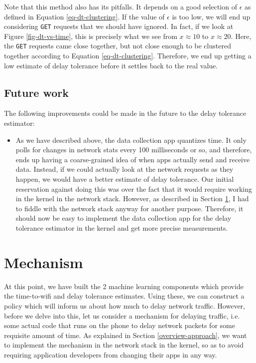 \documentclass[12pt, fleqn]{article}
\begin{document}
\begin{enumerate}
  Note that this method also has its pitfalls. It depends on a good selection of $\epsilon$ 
  as defined in Equation \ref{eq-dt-clustering}. If the value of $\epsilon$ is 
  too low, we will end up considering \texttt{GET} requests that we should have 
  ignored. In fact, if we look at Figure \ref{fig-dt-vs-time}, this is precisely 
  what we see from $x \approx 10$ to $x \approx 20$. Here, the \texttt{GET} 
  requests came close together, but not close enough to be clustered together according to 
  Equation \ref{eq-dt-clustering}. Therefore, we end up getting a low estimate of 
  delay tolerance before it settles back to the real value. 
  
\end{enumerate}

\subsection{Future work}

The following improvements could be made in the future to the delay tolerance 
estimator:

\begin{itemize}
  \item As we have described above, the data collection app quantizes time. It 
  only polls for changes in network stats every 100 milliseconds or so, and 
  therefore, ends up having a coarse-grained idea of when apps actually send and 
  receive data. Instead, if we could actually look at the network requests as 
  they happen, we would have a better estimate of delay tolerance. Our initial 
  reservation against doing this was over the fact that it would require working 
  in the kernel in the network stack. However, as described in Section 
  \ref{mechanism}, I had to fiddle with the network stack anyway for another purpose.
  Therefore, it should now be easy to implement the data collection app for the 
  delay tolerance estimator in the kernel and get more precise measurements. 
\end{itemize}



\section{Mechanism}
\label{mechanism}

At this point, we have built the 2 machine learning components which provide the 
time-to-wifi and delay tolerance estimates. Using these, we can construct a 
policy which will inform us about how much to delay network traffic. However, 
before we delve into this, let us consider a mechanism for delaying 
traffic, i.e. some actual code that runs on the phone to delay network packets for 
some requisite amount of time. As explained in Section \ref{overview-approach}, 
we want to implement the mechanism in the network stack in the kernel, so as to 
avoid requiring application developers from changing their apps in any way. 
\end{document}
